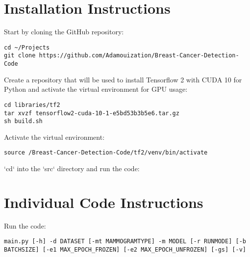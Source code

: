 \section{Installation Instructions}

Start by cloning the GitHub repository:

\begin{lstlisting}
cd ~/Projects
git clone https://github.com/Adamouization/Breast-Cancer-Detection-Code
\end{lstlisting}

Create a repository that will be used to install Tensorflow 2 with CUDA 10 for Python and activate the virtual environment for GPU usage:

\begin{lstlisting}
cd libraries/tf2
tar xvzf tensorflow2-cuda-10-1-e5bd53b3b5e6.tar.gz
sh build.sh
\end{lstlisting}

Activate the virtual environment:

\begin{lstlisting}
source /Breast-Cancer-Detection-Code/tf2/venv/bin/activate
\end{lstlisting}

`cd` into the `src` directory and run the code:


\section{Individual Code Instructions}

Run the code:

\begin{lstlisting}
main.py [-h] -d DATASET [-mt MAMMOGRAMTYPE] -m MODEL [-r RUNMODE] [-b BATCHSIZE] [-e1 MAX_EPOCH_FROZEN] [-e2 MAX_EPOCH_UNFROZEN] [-gs] [-v]
\end{lstlisting}

